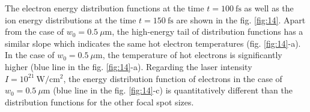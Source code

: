 The electron energy distribution functions at the time $ t = 100 \ \mathrm{fs} $ as well as the ion energy distributions at the time $ t = 150 \ \mathrm{fs} $ are shown in the fig. \ref{fig:14}. Apart from the case of $ w_0 = 0.5 \ \mu\mathrm{m} $, the high-energy tail of distribution functions has a similar slope which indicates the same hot electron temperatures (fig. \ref{fig:14}-a). In the case of $ w_0 = 0.5 \ \mu\mathrm{m} $, the temperature of hot electrons is significantly higher (blue line in the fig. \ref{fig:14}-a). Regarding the laser intensity $ I = 10^{21} \ \mathrm{W/cm^2} $, the energy distribution function of electrons in the case of $ w_0 = 0.5 \ \mu\mathrm{m} $ (blue line in the fig. \ref{fig:14}-c) is quantitatively different than the distribution functions for the other focal spot sizes.